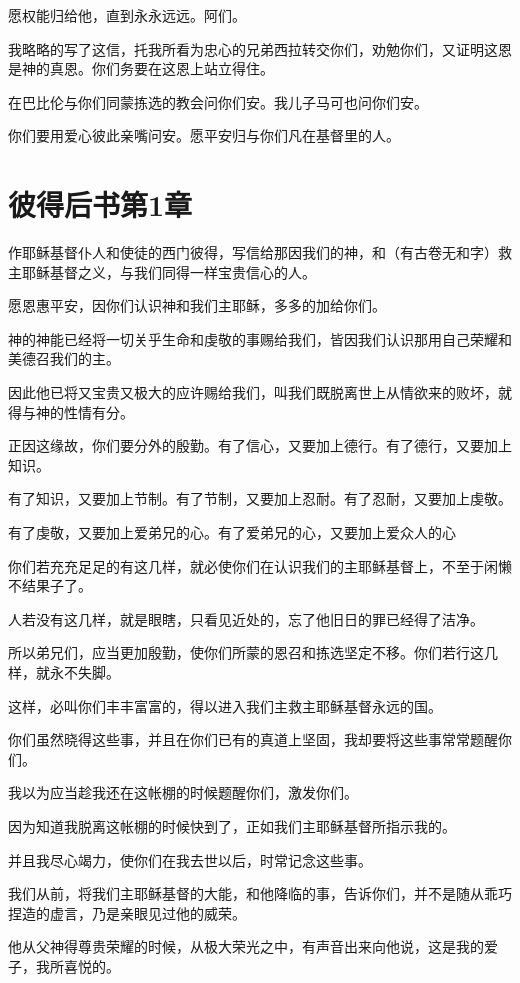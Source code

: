 \documentclass[12pt,oneside]{book}
\begin{document}
愿权能归给他，直到永永远远。阿们。

我略略的写了这信，托我所看为忠心的兄弟西拉转交你们，劝勉你们，又证明这恩是神的真恩。你们务要在这恩上站立得住。

在巴比伦与你们同蒙拣选的教会问你们安。我儿子马可也问你们安。

你们要用爱心彼此亲嘴问安。愿平安归与你们凡在基督里的人。

\chapter{彼得后书第1章}
作耶稣基督仆人和使徒的西门彼得，写信给那因我们的神，和（有古卷无和字）救主耶稣基督之义，与我们同得一样宝贵信心的人。

愿恩惠平安，因你们认识神和我们主耶稣，多多的加给你们。

神的神能已经将一切关乎生命和虔敬的事赐给我们，皆因我们认识那用自己荣耀和美德召我们的主。

因此他已将又宝贵又极大的应许赐给我们，叫我们既脱离世上从情欲来的败坏，就得与神的性情有分。

正因这缘故，你们要分外的殷勤。有了信心，又要加上德行。有了德行，又要加上知识。

有了知识，又要加上节制。有了节制，又要加上忍耐。有了忍耐，又要加上虔敬。

有了虔敬，又要加上爱弟兄的心。有了爱弟兄的心，又要加上爱众人的心

你们若充充足足的有这几样，就必使你们在认识我们的主耶稣基督上，不至于闲懒不结果子了。

人若没有这几样，就是眼瞎，只看见近处的，忘了他旧日的罪已经得了洁净。

所以弟兄们，应当更加殷勤，使你们所蒙的恩召和拣选坚定不移。你们若行这几样，就永不失脚。

这样，必叫你们丰丰富富的，得以进入我们主救主耶稣基督永远的国。

你们虽然晓得这些事，并且在你们已有的真道上坚固，我却要将这些事常常题醒你们。

我以为应当趁我还在这帐棚的时候题醒你们，激发你们。

因为知道我脱离这帐棚的时候快到了，正如我们主耶稣基督所指示我的。

并且我尽心竭力，使你们在我去世以后，时常记念这些事。

我们从前，将我们主耶稣基督的大能，和他降临的事，告诉你们，并不是随从乖巧捏造的虚言，乃是亲眼见过他的威荣。

他从父神得尊贵荣耀的时候，从极大荣光之中，有声音出来向他说，这是我的爱子，我所喜悦的。
\end{document}
